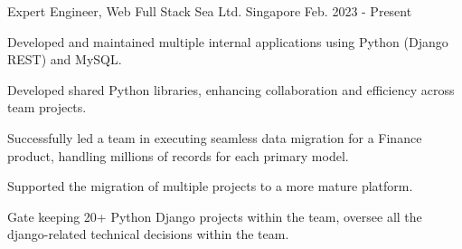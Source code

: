 

\begin{cventries}

  \cventry
    {Expert Engineer, Web Full Stack} %
    {Sea Ltd.} %
    {Singapore} %
    {Feb. 2023 - Present} %
    {
      \begin{cvitems} %
        \item {Developed and maintained multiple internal applications using Python (Django REST) and MySQL.}
        \item {Developed shared Python libraries, enhancing collaboration and efficiency across team projects.}
        \item {Successfully led a team in executing seamless data migration for a Finance product, handling millions of records for each primary model.}
        \item {Supported the migration of multiple projects to a more mature platform.}
        \item {Gate keeping 20+ Python Django projects within the team, oversee all the django-related technical decisions within the team.}
      \end{cvitems}
    }


\end{cventries}

